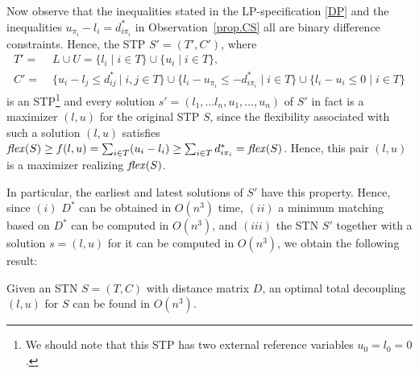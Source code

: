 Now observe that the inequalities stated in the LP-specification \ref{DP} and the inequalities $u_{\pi_i} - l_i = d^*_{i\pi_i}$ in Observation~\ref{prop.CS} all are binary difference constraints. Hence, the STP $S' = (T', C' )$, where
\begin{align*}
T'=&\; L \cup U = \{l_i \;|\; i \in T \} \cup \{u_i \;|\; i \in T \}, \\
C' =&\; \{ u_i - l_j \leq d^*_{ij} \:|\; i, j \in T \} \cup \{ l_i - u_{\pi_i} \leq - d^*_{i\pi_i}  \mid  i \in T \} \cup \{ l_i - u_i  \leq 0  \mid  i \in T \} 
\end{align*}
is an STP\footnote{We should note that this STP has two external reference variables $u_0=l_0=0$.} and every solution $s' = (l_1, \ldots l_n, u_1, \ldots, u_n)$ of $S'$ in fact is a maximizer $(l, u)$ for the original STP $S$, since
the flexibility associated with such a solution $(l, u)$ satisfies $\mathit{flex}(S) \geq f(l, u) = \sum_{i \in T} (u_i - l_i) \geq \sum_{i \in T} d^*_{i\pi_i} = \mathit{flex}(S)$. Hence, this pair $(l, u)$ is a maximizer realizing $\mathit{flex}(S)$.

In particular, the earliest and latest solutions of $S'$ have this property.
Hence, since $(i)$ $D^*$ can be obtained in $O(n^3)$ time, $(ii)$ a minimum matching based on $D^*$ can be computed in $O(n^3)$, and $(iii)$ the STN $S'$ together with a solution $s = (l, u)$ for it can be computed in $O(n^3)$,
we obtain the following result: 
\begin{corollary}\label{corrolary-TD-to-MM} 
Given an STN $S=(T,C)$ with distance matrix $D$,
an optimal total decoupling $(l, u)$  for $S$ can be found in $O(n^3)$.
\end{corollary}

